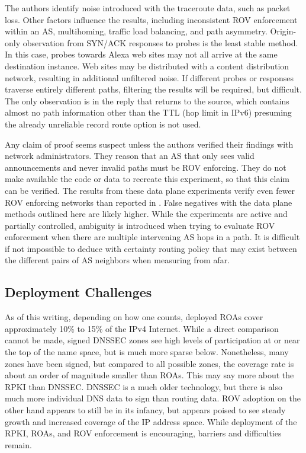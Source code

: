 \documentclass[sigconf]{acmart}
\begin{document}
The authors identify noise introduced with the traceroute data, such as
packet loss.  Other factors influence the results, including
inconsistent ROV enforcement within an AS, multihoming, traffic load
balancing, and path asymmetry.  Origin-only observation from SYN/ACK
responses to probes is the least stable method.  In this case, probes
towards Alexa web sites may not all arrive at the same destination
instance.  Web sites may be distributed with a content distribution
network, resulting in additional unfiltered noise.  If different probes
or responses traverse entirely different paths, filtering the results
will be required, but difficult.   The only observation is in the reply
that returns to the source, which contains almost no path information
other than the TTL (hop limit in IPv6) presuming the already unreliable
record route option is not used.

Any claim of proof seems suspect unless the authors verified their
findings with network administrators.  They reason that an AS that only
sees valid announcements and never invalid paths must be ROV enforcing.
They do not make available the code or data to recreate this experiment,
so that this claim can be verified.  The results from these data plane
experiments verify even fewer ROV enforcing networks than reported in
\cite{reuter_towards_2018}.  False negatives with the data plane methods
outlined here are likely higher.  While the experiments are active and
partially controlled, ambiguity is introduced when trying to evaluate
ROV enforcement when there are multiple intervening AS hops in a path.
It is difficult if not impossible to deduce with certainty routing
policy that may exist between the different pairs of AS neighbors when
measuring from afar.

\subsection{Deployment Challenges}

As of this writing, depending on how one counts, deployed ROAs cover
approximately 10\% to 15\% of the IPv4 Internet.  While a direct
comparison cannot be made, signed DNSSEC zones see high levels of
participation at or near the top of the name space, but is much more
sparse below.  Nonetheless, many zones have been signed, but compared to
all possible zones, the coverage rate is about an order of magnitude
smaller than ROAs.  This may say more about the RPKI than DNSSEC.
DNSSEC is a much older technology, but there is also much more
individual DNS data to sign than routing data.  ROV adoption on the
other hand appears to still be in its infancy, but appears poised to see
steady growth and increased coverage of the IP address space.  While
deployment of the RPKI, ROAs, and ROV enforcement is encouraging,
barriers and difficulties remain.
\end{document}
